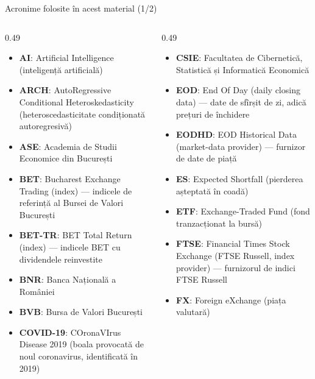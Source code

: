 {
\begin{frame}[noframenumbering]
    \titlepage
\end{frame}
}
\begin{frame}{Acronime folosite în acest material (1/2)}
\begin{columns}[T]
\begin{column}{0.49\textwidth}
\begin{itemize}\setlength{\itemsep}{0pt}
    \item \textbf{AI}: Artificial Intelligence (inteligență artificială)
    \item \textbf{ARCH}: AutoRegressive Conditional Heteroskedasticity (heteroscedasticitate condiționată autoregresivă)
    \item \textbf{ASE}: Academia de Studii Economice din București
    \item \textbf{BET}: Bucharest Exchange Trading (index) — indicele de referință al Bursei de Valori București
    \item \textbf{BET-TR}: BET Total Return (index) — indicele BET cu dividendele reinvestite
    \item \textbf{BNR}: Banca Națională a României
    \item \textbf{BVB}: Bursa de Valori București
    \item \textbf{COVID-19}: COronaVIrus Disease 2019 (boala provocată de noul coronavirus, identificată în 2019)
\end{itemize}
\end{column}
\begin{column}{0.49\textwidth}
\begin{itemize}\setlength{\itemsep}{0pt}
    \item \textbf{CSIE}: Facultatea de Cibernetică, Statistică și Informatică Economică
    \item \textbf{EOD}: End Of Day (daily closing data) — date de sfîrșit de zi, adică prețuri de închidere
    \item \textbf{EODHD}: EOD Historical Data (market-data provider) — furnizor de date de piață
    \item \textbf{ES}: Expected Shortfall (pierderea așteptată în coadă)
    \item \textbf{ETF}: Exchange-Traded Fund (fond tranzacționat la bursă)
    \item \textbf{FTSE}: Financial Times Stock Exchange (FTSE Russell, index provider) — furnizorul de indici FTSE Russell
    \item \textbf{FX}: Foreign eXchange (piața valutară)
\end{itemize}
\end{column}
\end{columns}
\end{frame}
